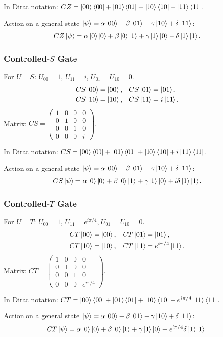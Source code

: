 \documentclass[10pt,a4paper]{article}
\begin{document}
In Dirac notation: $CZ = \ket{00}\bra{00}+\ket{01}\bra{01}+\ket{10}\bra{10}-\ket{11}\bra{11}$.

Action on a general state $\ket{\psi}=\alpha\ket{00}+\beta\ket{01}+\gamma\ket{10}+\delta\ket{11}$:
\[
CZ\ket{\psi} = \alpha\ket{0}\ket{0}+\beta\ket{0}\ket{1}+\gamma\ket{1}\ket{0}-\delta\ket{1}\ket{1}.
\]

\subsubsection*{Controlled-$S$ Gate}
For $U=S$: $U_{00}=1$, $U_{11}=i$, $U_{01}=U_{10}=0$.
\begin{align*}
CS\ket{00}&=\ket{00}, & CS\ket{01}&=\ket{01}, \\
CS\ket{10}&=\ket{10}, & CS\ket{11}&=i\ket{11}.
\end{align*}
Matrix: $CS =\begin{pmatrix}1&0&0&0\\0&1&0&0\\0&0&1&0\\0&0&0&i\end{pmatrix}$.

In Dirac notation: $CS = \ket{00}\bra{00}+\ket{01}\bra{01}+\ket{10}\bra{10}+i\ket{11}\bra{11}$.

Action on a general state $\ket{\psi}=\alpha\ket{00}+\beta\ket{01}+\gamma\ket{10}+\delta\ket{11}$:
\[
CS\ket{\psi} = \alpha\ket{0}\ket{0}+\beta\ket{0}\ket{1}+\gamma\ket{1}\ket{0}+i\delta\ket{1}\ket{1}.
\]

\subsubsection*{Controlled-$T$ Gate}
For $U=T$: $U_{00}=1$, $U_{11}=e^{i\pi/4}$, $U_{01}=U_{10}=0$.
\begin{align*}
CT\ket{00}&=\ket{00}, & CT\ket{01}&=\ket{01}, \\
CT\ket{10}&=\ket{10}, & CT\ket{11}&=e^{i\pi/4}\ket{11}.
\end{align*}
Matrix: $CT =\begin{pmatrix}1&0&0&0\\0&1&0&0\\0&0&1&0\\0&0&0&e^{i\pi/4}\end{pmatrix}$.

In Dirac notation: $CT = \ket{00}\bra{00}+\ket{01}\bra{01}+\ket{10}\bra{10}+e^{i\pi/4}\ket{11}\bra{11}$.

Action on a general state $\ket{\psi}=\alpha\ket{00}+\beta\ket{01}+\gamma\ket{10}+\delta\ket{11}$:
\[
CT\ket{\psi} = \alpha\ket{0}\ket{0}+\beta\ket{0}\ket{1}+\gamma\ket{1}\ket{0}+e^{i\pi/4}\delta\ket{1}\ket{1}.
\]
\end{document}
